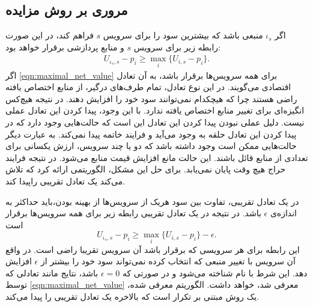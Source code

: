     \subsection{مروری بر روش مزایده}
      اگر $\iota_s$ منبعی باشد که بیشترین سود را برای سرویس $s$ فراهم کند، در این صورت رابطه زیر برای سرویس $s$ و منابع پردازشی برقرار خواهد بود:
      \begin{align}\label{eqn:maximal_net_value}
        U_{\iota_s,s} - p_i \ge \max_i \{U_{i,s} - p_i\}.
      \end{align}
      اگر \cref{eqn:maximal_net_value} برای همه سرویس‌ها برقرار باشد، به آن تعادل اقتصادی می‌گویند\cite{auction_algorithms_bertsekas}.
      {در این نوع تعادل، تمام طرف‌های درگیر، از منابع اختصاص یافته راضی هستند چرا که هیچکدام نمی‌توانند سود خود را افزایش دهند.}
      در نتیجه هیچ‌کس انگیزه‌ای برای تغییر منابع اختصاص یافته ندارد.
      با این وجود، پیدا کردن این تعادل عملی نیست.
      دلیل عملی نبودن پیدا کردن این تعادل این است که حالت‌هایی وجود دارد که در {} پیدا کردن این تعادل حلقه به وجود می‌آید و فرایند خاتمه پیدا نمی‌کند.
      به عبارت دیگر حالت‌هایی ممکن است وجود داشته باشد که دو یا چند سرویس، ارزش یکسانی برای تعدادی از منابع قائل باشند.
      این حالت مانع افزایش قیمت منابع می‌شود.
      در نتیجه فرایند حراج هیچ وقت پایان نمی‌یابد.
      برای حل این مشکل، \cite{auction_algorithms_bertsekas} الگوریتمی ارائه کرد که تلاش می‌کند یک تعادل تقریبی راپیدا کند.
      
      در یک تعادل تقریبی، تفاوت بین سود هریک از سرویس‌ها از بهینه بودن،باید حداکثر به اندازه‌ی $\epsilon$ باشد.
      در نتیجه در یک تعادل تقریبی رابطه زیر برای همه سرویس‌ها برقرار است
      \begin{equation}\label{eqn:almost_equilibrium}
        U_{\iota_s,s} - p_i \ge \max_i \{U_{i,s} - p_i\} - \epsilon.
      \end{equation}
      این رابطه برای هر سرویسی که برقرار باشد آن سرویس تقریبا راضی است.
      در واقع آن سرویس با تغییر منبعی که انتخاب کرده نمی‌تواند سود خود را بیشتر از $\epsilon$ افزایش دهد.
      این شرط با نام  شناخته می‌شود و در صورتی که $\epsilon = 0$ باشد، نتایج مانند تعادلی که توسط \cref{eqn:maximal_net_value} معرفی شد، خواهد داشت.
      الگوریتم معرفی شده، یک روش مبتنی بر تکرار است که بالاخره یک تعادل تقریبی را پیدا می‌کند.

